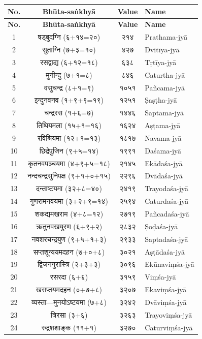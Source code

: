 \documentclass[11pt,a4paper]{book}
\begin{document}
\begin{center}
\begin{longtable}{|c|c|c|l|}
\hline
\textbf{No.} & \textbf{Bhūta-saṅkhyā} & \textbf{Value} & \textbf{Name}\\
\hline
\endfirsthead
\hline
\textbf{No.} & \textbf{Bhūta-saṅkhyā} & \textbf{Value} & \textbf{Name}\\
\hline
\endhead
1 & षड्बुदग्नि (६+१४=२०) & २१४ & Prathama-jyā \\
2 & सुताग्नि (७+३=१०) & ४२७ & Dvitīya-jyā \\
3 & रसद्वाद्य (६+१२=१८) & ६३८ & Tṛtīya-jyā \\
4 & मुनीन्दु (७+१=८) & ८४६ & Caturtha-jyā \\
5 & वसुचन्द्र (८+१=९) & १०५१ & Pañcama-jyā \\
6 & इन्दुनवनव (१+९+९=१९) & १२५१ & Ṣaṣṭha-jyā \\
7 & चन्द्ररस (१+६=७) & १४४६ & Saptama-jyā \\
8 & तिथियमला (१५+१=१६) & १६२४ & Aṣṭama-jyā \\
9 & रविश्रियमा (१२+१=१३) & १८१७ & Navama-jyā \\
10 & छिद्रेपुजिन (९+५=१४) & १९९१ & Daśama-jyā \\
11 & कृतनवपञ्चयमा (४+९+५=१८) & २१४५ & Ekādaśa-jyā \\
12 & नन्दचन्द्रसुनिपक्ष (९+१+०+१५) & २२९६ & Dvādaśa-jyā \\
13 & दन्ताष्टयमा (३२+८=४०) & २४१९ & Trayodaśa-jyā \\
14 & गुणरामनवयमा (३+२+९=१४) & २५९४ & Caturdaśa-jyā \\
15 & शकद्यमखराम (४+८=१२) & २७१९ & Pañcadaśa-jyā \\
16 & ऋतुनवखयुरण (६+९+२) & २८३२ & Ṣoḍaśa-jyā \\
17 & नवशरचन्द्रयुण (९+५+१+३) & २९३३ & Saptadaśa-jyā \\
18 & सप्तशून्ययमदहन (७+०+८) & ३०२१ & Aṣṭādaśa-jyā \\
19 & द्विजनगुरास्त्रि (२+३+३) & ३०९६ & Ekūnaviṃśa-jyā \\
20 & रसरदा (६+६) & ३१५९ & Viṃśa-jyā \\
21 & खसप्तयमदहन (०+७+८) & ३२०७ & Ekaviṃśa-jyā \\
22 & व्यस्ता---मुनयोऽष्टयमा (७+८) & ३२४२ & Dvāviṃśa-jyā \\
23 & त्रिरसा (३+६) & ३२६३ & Trayoviṃśa-jyā \\
24 & रुद्रशशाङ्क (११+१) & ३२७० & Caturviṃśa-jyā \\
\hline
\end{longtable}
\end{center}
\end{document}
